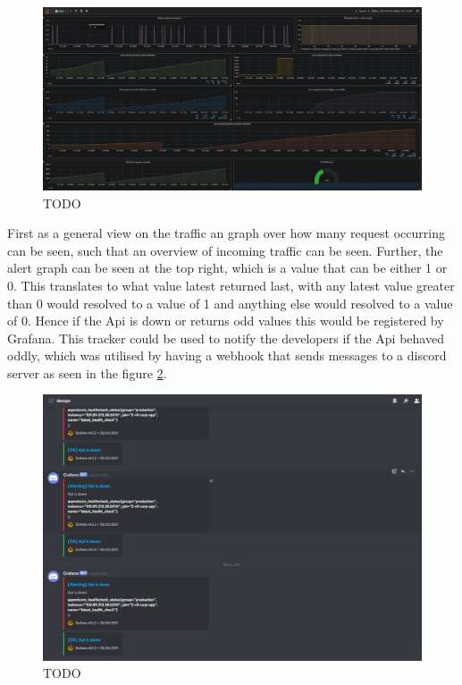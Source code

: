 \documentclass[report/main.tex]{subfiles}
\begin{document}
                \begin{figure}[H]
                    \centering
                    \includegraphics[width=\textwidth]{report/images/Grafana Setup.jpg}
                    \caption{TODO}
                    \label{fig:grafana_setup}
                \end{figure}
            
                First as a general view on the traffic an graph over how many request occurring can be seen, such that an overview of incoming traffic can be seen. Further, the alert graph can be seen at the top right, which is a value that can be either 1 or 0. This translates to what value latest returned last, with any latest value greater than 0 would resolved to a value of 1 and anything else would resolved to a value of 0. Hence if the Api is down or returns odd values this would be registered by Grafana. This tracker could be used to notify the developers if the Api behaved oddly, which was utilised by having a webhook that sends messages to a discord server as seen in the figure \ref{fig:grafana_discord_alert}.
                
                \begin{figure}[H]
                    \centering
                    \includegraphics[width=\textwidth]{report/images/Grafana Discord Alert.jpg}
                    \caption{TODO}
                    \label{fig:grafana_discord_alert}
                \end{figure}
                
\end{document}
